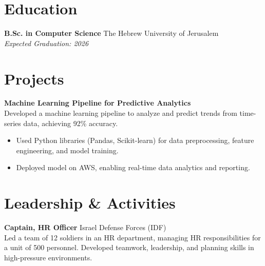 \documentclass[a4paper,10pt]{article}
\begin{document}
\section*{Education}
\textbf{B.Sc. in Computer Science} \hfill The Hebrew University of Jerusalem \\
\textit{Expected Graduation: 2026} \\

\section*{Projects}
\textbf{Machine Learning Pipeline for Predictive Analytics} \\
Developed a machine learning pipeline to analyze and predict trends from time-series data, achieving 92\% accuracy.
\begin{itemize}[noitemsep,nolistsep]
    \item Used Python libraries (Pandas, Scikit-learn) for data preprocessing, feature engineering, and model training.
    \item Deployed model on AWS, enabling real-time data analytics and reporting.
\end{itemize}

\section*{Leadership \& Activities}
\textbf{Captain, HR Officer} \hfill Israel Defense Forces (IDF) \\
Led a team of 12 soldiers in an HR department, managing HR responsibilities for a unit of 500 personnel. Developed teamwork, leadership, and planning skills in high-pressure environments.
\end{document}
